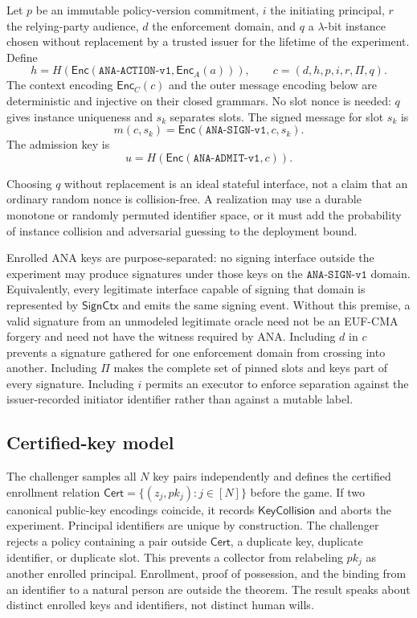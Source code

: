 \documentclass[10pt]{article}
\newcommand{\code}[1]{\texttt{#1}}
\newcommand{\Enc}{\mathsf{Enc}}
\begin{document}
Let $p$ be an immutable policy-version commitment, $i$ the initiating principal,
$r$ the relying-party audience, $d$ the enforcement domain, and $q$ a
$\lambda$-bit instance chosen without replacement by a trusted issuer for the
lifetime of the experiment. Define
\[
  h=H(\Enc(\code{ANA-ACTION-v1},\Enc_A(a))),\qquad
  c=(d,h,p,i,r,\Pi,q).
\]
The context encoding $\Enc_C(c)$ and the outer message encoding below are
deterministic and injective on their closed grammars. No slot nonce is needed:
$q$ gives instance uniqueness and $s_k$ separates slots. The signed message for
slot $s_k$ is
\[
 m(c,s_k)=\Enc(\code{ANA-SIGN-v1},c,s_k).
\]
The admission key is
\[
 u=H(\Enc(\code{ANA-ADMIT-v1},c)).
\]

Choosing $q$ without replacement is an ideal stateful interface, not a claim
that an ordinary random nonce is collision-free. A realization may use a
durable monotone or randomly permuted identifier space, or it must add the
probability of instance collision and adversarial guessing to the deployment
bound.

Enrolled ANA keys are purpose-separated: no signing interface outside the
experiment may produce signatures under those keys on the
$\code{ANA-SIGN-v1}$ domain. Equivalently, every legitimate interface capable
of signing that domain is represented by $\mathsf{SignCtx}$ and emits the same
signing event. Without this premise, a valid signature from an unmodeled
legitimate oracle need not be an EUF-CMA forgery and need not have the witness
required by ANA.
Including $d$ in $c$ prevents a signature gathered for one enforcement domain
from crossing into another. Including $\Pi$ makes the complete set of pinned
slots and keys part of every signature. Including $i$ permits an executor to
enforce separation against the issuer-recorded initiator identifier rather than
against a mutable label.

\subsection{Certified-key model}

The challenger samples all $N$ key pairs independently and defines the certified
enrollment relation $\mathsf{Cert}=\{(z_j,pk_j):j\in[N]\}$ before the game.
If two canonical public-key encodings coincide, it records
$\mathsf{KeyCollision}$ and aborts the experiment. Principal identifiers are
unique by construction. The challenger rejects a
policy containing a pair outside $\mathsf{Cert}$, a duplicate key, duplicate
identifier, or duplicate slot. This prevents a collector from relabeling
$pk_j$ as another enrolled principal. Enrollment, proof of possession, and the
binding from an identifier to a natural person are outside the theorem. The
result speaks about distinct enrolled keys and identifiers, not distinct human
wills.
\end{document}
